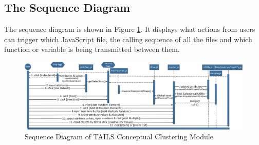 \subsection{The Sequence Diagram}
The sequence diagram is shown in Figure \ref{Fig:SequenceDigram}. It displays what actions from users can trigger which JavaScript file, the calling sequence of all the files and which function or variable is being transmitted between them.
\begin{figure}[h!]
    \centering
    \includegraphics[width=400pt]{../images/sequence_diagram_for_Conceptual_clustering.jpg}
    \caption{Sequence Diagram of TAILS Conceptual Clustering Module}
    \label{Fig:SequenceDigram}
\end{figure}


